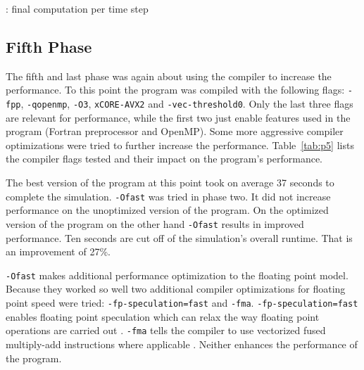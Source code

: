 \documentclass[twoside,11pt]{article}
\begin{document}
\begin{algorithm} %
  \caption{: final computation per time step}
  \label{alg:final}

  \begin{algorithmic}[1]


      \ENDFOR

    \ENDFOR

  \end{algorithmic}
\end{algorithm} %


\subsection{Fifth Phase} %
\label{subsec:p5}

The fifth and last phase was again about using the compiler to
increase the performance.
To this point the program was compiled with the following flags:
\texttt{-fpp}, \texttt{-qopenmp}, \texttt{-O3}, \texttt{xCORE-AVX2}
and \texttt{-vec-threshold0}.
Only the last three flags are relevant for performance, while the
first two just enable features used in the program (Fortran
preprocessor and OpenMP).
Some more aggressive compiler optimizations were tried to further
increase the performance.
Table~\ref{tab:p5} lists the compiler flags tested and their impact on
the program's performance.

The best version of the program at this point took on average 37
seconds to complete the simulation.
\texttt{-Ofast} was tried in phase two.
It did not increase performance on the unoptimized version of the
program.
On the optimized version of the program on the other hand
\texttt{-Ofast} results in improved performance.
Ten seconds are cut off of the simulation's overall runtime. That
is an improvement of 27\%.

\texttt{-Ofast} makes additional performance optimization to the
floating point model.
Because they worked so well two additional compiler optimizations for
floating point speed were tried: \texttt{-fp-speculation=fast} and
\texttt{-fma}.
\texttt{-fp-speculation=fast} enables floating point speculation which
can relax the way floating point operations are carried out
\citep{fp_speculation}.
\texttt{-fma} tells the compiler to use vectorized fused multiply-add
instructions where applicable \citep{fma}.
Neither enhances the performance of the program.
\end{document}
